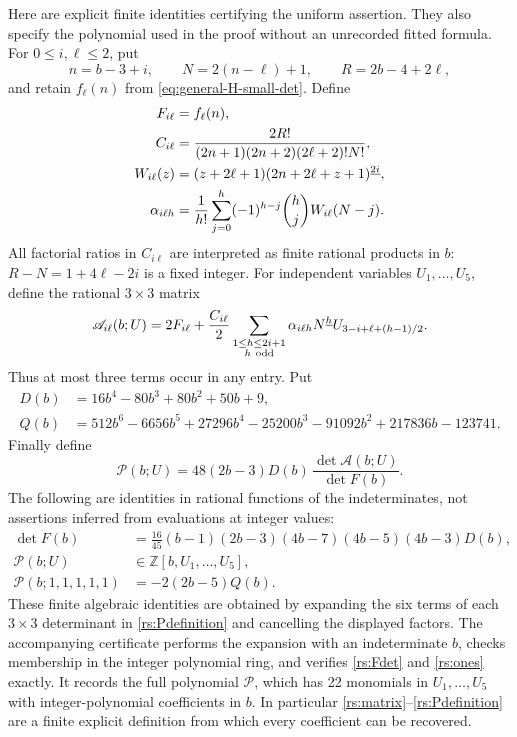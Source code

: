 \documentclass[11pt,a4paper]{article}
\numberwithin{equation}{section}
\theoremstyle{plain}
\theoremstyle{definition}
\theoremstyle{remark}
\begin{document}
Here are explicit finite identities certifying the uniform assertion.
They also specify the polynomial used in the proof without an
unrecorded fitted formula. For $0\le i,\ell\le2$, put
\[
 n=b-3+i,\qquad N=2(n-\ell)+1,\qquad R=2b-4+2\ell,
\]
and retain $f_\ell(n)$ from
\eqref{eq:general-H-small-det}. Define
\begin{align}
 F_{i\ell}&=f_\ell(n),\notag\\
 C_{i\ell}&=\frac{2R!}
 {(2n+1)(2n+2)(2\ell+2)!N!},\label{rs:C}\\
 W_{i\ell}(z)&=(z+2\ell+1)
                 (2n+2\ell+z+1)^{\underline{2i}},\notag\\
 \alpha_{i\ell h}&=\frac1{h!}\sum_{j=0}^h
             (-1)^{h-j}\binom hj W_{i\ell}(N-j).
 \label{rs:alpha}
\end{align}
All factorial ratios in $C_{i\ell}$ are interpreted as finite rational
products in $b$: $R-N=1+4\ell-2i$ is a fixed integer.
For independent variables $U_1,\ldots,U_5$, define the rational
$3\times3$ matrix
\begin{equation}\label{rs:matrix}
 \mathscr A_{i\ell}(b;U)
 =2F_{i\ell}+\frac{C_{i\ell}}2
 \sum_{\substack{1\le h\le2i+1\\h\ {\rm odd}}}
 \alpha_{i\ell h}N^{\underline h}
       U_{3-i+\ell+(h-1)/2}.
\end{equation}
Thus at most three terms occur in any entry. Put
\begin{align}
 D(b)&=16b^4-80b^3+80b^2+50b+9,\label{rs:D}\\
 Q(b)&=512b^6-6656b^5+27296b^4-25200b^3
              -91092b^2+217836b-123741.\label{rs:Q}
\end{align}
Finally define
\begin{equation}\label{rs:Pdefinition}
 \mathscr P(b;U)
 =48(2b-3)D(b)\,\frac{\det\mathscr A(b;U)}{\det F(b)}.
\end{equation}
The following are identities in rational functions of the indeterminates,
not assertions inferred from evaluations at integer values:
\begin{align}
 \det F(b)&=\frac{16}{45}(b-1)(2b-3)(4b-7)(4b-5)(4b-3)D(b),
 \label{rs:Fdet}\\
 \mathscr P(b;U)&\in\mathbb Z[b,U_1,\ldots,U_5],
 \label{rs:integrality}\\
 \mathscr P(b;1,1,1,1,1)&=-2(2b-5)Q(b).
 \label{rs:ones}
\end{align}
These finite algebraic identities are obtained by expanding the six
terms of each $3\times3$ determinant in
\eqref{rs:Pdefinition} and cancelling the displayed factors.
The accompanying certificate performs the expansion with an
indeterminate $b$, checks membership in the integer polynomial ring,
and verifies \eqref{rs:Fdet} and \eqref{rs:ones} exactly. It records
the full polynomial $\mathscr P$, which has 22 monomials in
$U_1,\ldots,U_5$ with integer-polynomial coefficients in $b$.
In particular \eqref{rs:matrix}--\eqref{rs:Pdefinition} are a finite
explicit definition from which every coefficient can be recovered.
\end{document}
